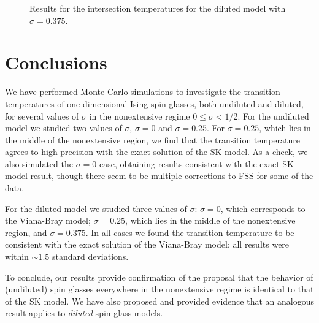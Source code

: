 \begin{figure}
  \centering
  
  \caption[
    Results for the intersection temperatures for the diluted model with
    $\sigma=0.375$.
  ]
  {
    Results for the intersection temperatures for the diluted model with
    $\sigma=0.375$.
  }
  \label{fig:Tx-d-375}
\end{figure}


\section{Conclusions}

We have performed Monte Carlo simulations to investigate the transition
temperatures of one-dimensional Ising spin glasses, both undiluted and diluted,
for several values of $\sigma$ in the nonextensive regime $0 \leq \sigma <
1/2$. For the undiluted model we studied two values of $\sigma$, $\sigma=0$ and
$\sigma=0.25$. For $\sigma=0.25$, which lies in the middle of the nonextensive
region, we find that the transition temperature agrees to high precision with
the exact solution of the SK model. As a check, we also simulated the
$\sigma=0$ case, obtaining results consistent with the exact SK model result,
though there seem to be multiple corrections to FSS for some of the data.

For the diluted model we studied three values of $\sigma$: $\sigma=0$, which
corresponds to the Viana-Bray model; $\sigma=0.25$, which lies in the middle of
the nonextensive region, and $\sigma=0.375$. In all cases we found the
transition temperature to be consistent with the exact solution of the
Viana-Bray model; all results were within $\sim 1.5$ standard deviations.

To conclude, our results provide confirmation of the proposal
\autocite{mori2011instability} that the behavior of (undiluted) spin glasses
everywhere in the nonextensive regime is identical to that of the SK model. We
have also proposed and provided evidence that an analogous result applies to
\emph{diluted} spin glass models.
